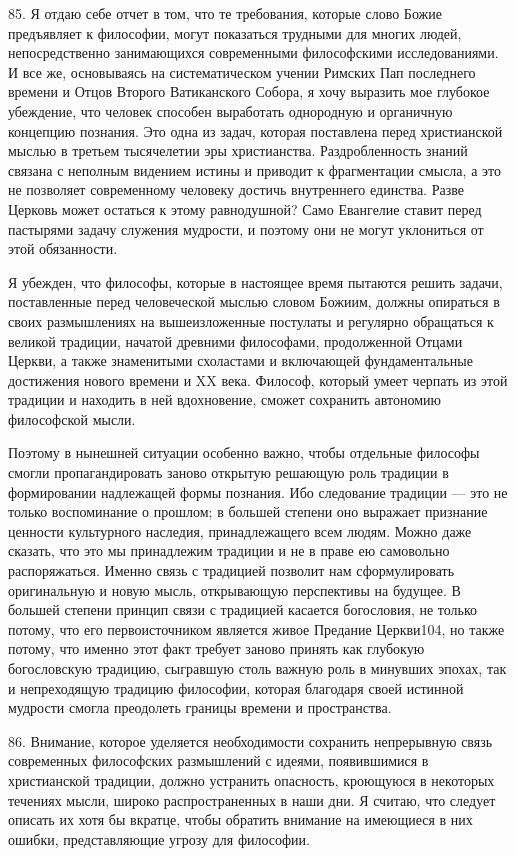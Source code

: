 \documentclass[a5paper,10pt]{article}
\begin{document}
85. Я отдаю себе отчет в том, что те требования, которые слово Божие
предъявляет к философии, могут показаться трудными для многих людей,
непосредственно занимающихся современными философскими исследованиями. И все
же, основываясь на систематическом учении Римских Пап последнего времени и
Отцов Второго Ватиканского Собора, я хочу выразить мое глубокое убеждение, что
человек способен выработать однородную и органичную концепцию познания. Это
одна из задач, которая поставлена перед христианской мыслью в третьем
тысячелетии эры христианства. Раздробленность знаний связана с неполным
видением истины и приводит к фрагментации смысла, а это не позволяет
современному человеку достичь внутреннего единства. Разве Церковь может
остаться к этому равнодушной? Само Евангелие ставит перед пастырями задачу
служения мудрости, и поэтому они не могут уклониться от этой обязанности.

Я убежден, что философы, которые в настоящее время пытаются решить задачи,
поставленные перед человеческой мыслью словом Божиим, должны опираться в своих
размышлениях на вышеизложенные постулаты и регулярно обращаться к великой
традиции, начатой древними философами, продолженной Отцами Церкви, а также
знаменитыми схоластами и включающей фундаментальные достижения нового времени и
XX века. Философ, который умеет черпать из этой традиции и находить в ней
вдохновение, сможет сохранить автономию философской мысли.

Поэтому в нынешней ситуации особенно важно, чтобы отдельные философы смогли
пропагандировать заново открытую решающую роль традиции в формировании
надлежащей формы познания. Ибо следование традиции — это не только воспоминание
о прошлом; в большей степени оно выражает признание ценности культурного
наследия, принадлежащего всем людям. Можно даже сказать, что это мы принадлежим
традиции и не в праве ею самовольно распоряжаться. Именно связь с традицией
позволит нам сформулировать оригинальную и новую мысль, открывающую перспективы
на будущее. В большей степени принцип связи с традицией касается богословия, не
только потому, что его первоисточником является живое Предание Церкви104, но
также потому, что именно этот факт требует заново принять как глубокую
богословскую традицию, сыгравшую столь важную роль в минувших эпохах, так и
непреходящую традицию философии, которая благодаря своей истинной мудрости
смогла преодолеть границы времени и пространства.

86. Внимание, которое уделяется необходимости сохранить непрерывную связь
современных философских размышлений с идеями, появившимися в христианской
традиции, должно устранить опасность, кроющуюся в некоторых течениях мысли,
широко распространенных в наши дни. Я считаю, что следует описать их хотя бы
вкратце, чтобы обратить внимание на имеющиеся в них ошибки, представляющие
угрозу для философии.
\end{document}
